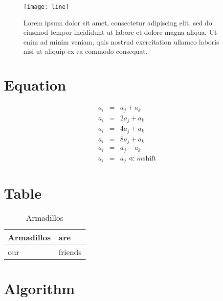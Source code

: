 \begin{figure}	
	\label{fig:sample-line}
	\centering
	\texttt{[image: line]}
	\caption{Lorem ipsum dolor sit amet, consectetur adipiscing elit, sed do eiusmod tempor incididunt ut labore et dolore magna aliqua. Ut enim ad minim veniam, quis nostrud exercitation ullamco laboris nisi ut aliquip ex ea commodo consequat.}
\end{figure}

\section*{Equation}


\begin{eqnarray*}
	a_i & = & a_j + a_k \\
	a_i & = & 2a_j + a_k \\
	a_i & = & 4a_j + a_k \\
	a_i & = & 8a_j + a_k \\
	a_i & = & a_j - a_k \\
	a_i & = & a_j \ll m \mbox{shift}
\end{eqnarray*}


\section*{Table}

\begin{table}
	\caption{Armadillos}
	\label{arm:table}
	\begin{center}
		\begin{tabular}{||l|l||}\hline
			Armadillos & are \\\hline
			our	   & friends \\\hline
		\end{tabular}
	\end{center}
\end{table}

\section*{Algorithm}


